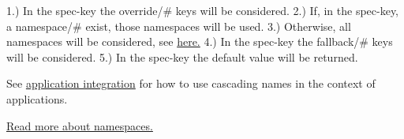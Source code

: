 1.) In the {\ttfamily spec}-\/key the {\ttfamily override/\#} keys will be considered. 2.) If, in the {\ttfamily spec}-\/key, a {\ttfamily namespace/\#} exist, those namespaces will be used. 3.) Otherwise, all namespaces will be considered, see \hyperlink{md_doc_help_elektra-namespaces_doc_help_elektra-namespaces_md}{here.} 4.) In the {\ttfamily spec}-\/key the {\ttfamily fallback/\#} keys will be considered. 5.) In the {\ttfamily spec}-\/key the {\ttfamily default} value will be returned.

See \hyperlink{doc_tutorials_application-integration_md}{application integration} for how to use cascading names in the context of applications.

\hyperlink{md_doc_help_elektra-namespaces_doc_help_elektra-namespaces_md}{Read more about namespaces.} 